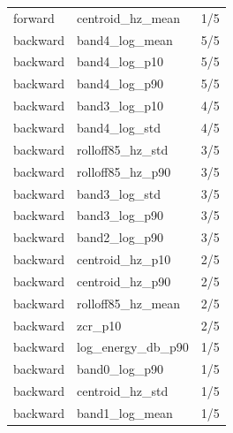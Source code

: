 \documentclass[10pt,a4paper]{article}
\begin{document}
\begin{center}
\begin{longtable}{lll}
forward & centroid\_hz\_mean & 1/5\\
backward & band4\_log\_mean & 5/5\\
backward & band4\_log\_p10 & 5/5\\
backward & band4\_log\_p90 & 5/5\\
backward & band3\_log\_p10 & 4/5\\
backward & band4\_log\_std & 4/5\\
backward & rolloff85\_hz\_std & 3/5\\
backward & rolloff85\_hz\_p90 & 3/5\\
backward & band3\_log\_std & 3/5\\
backward & band3\_log\_p90 & 3/5\\
backward & band2\_log\_p90 & 3/5\\
backward & centroid\_hz\_p10 & 2/5\\
backward & centroid\_hz\_p90 & 2/5\\
backward & rolloff85\_hz\_mean & 2/5\\
backward & zcr\_p10 & 2/5\\
backward & log\_energy\_db\_p90 & 1/5\\
backward & band0\_log\_p90 & 1/5\\
backward & centroid\_hz\_std & 1/5\\
backward & band1\_log\_mean & 1/5\\
\end{longtable}\end{center}
\end{document}
